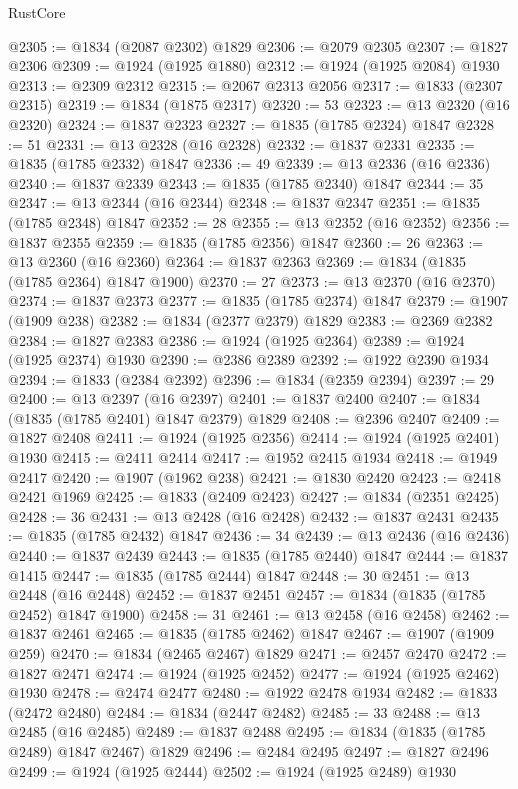 \begin{lexlean}{RustCore}
\begin{coremodule}
@2305 := @1834 (@2087 @2302) @1829
@2306 := @2079 @2305
@2307 := @1827 @2306
@2309 := @1924 (@1925 @1880)
@2312 := @1924 (@1925 @2084) @1930
@2313 := @2309 @2312
@2315 := @2067 @2313 @2056
@2317 := @1833 (@2307 @2315)
@2319 := @1834 (@1875 @2317)
@2320 := 53
@2323 := @13 @2320 (@16 @2320)
@2324 := @1837 @2323
@2327 := @1835 (@1785 @2324) @1847
@2328 := 51
@2331 := @13 @2328 (@16 @2328)
@2332 := @1837 @2331
@2335 := @1835 (@1785 @2332) @1847
@2336 := 49
@2339 := @13 @2336 (@16 @2336)
@2340 := @1837 @2339
@2343 := @1835 (@1785 @2340) @1847
@2344 := 35
@2347 := @13 @2344 (@16 @2344)
@2348 := @1837 @2347
@2351 := @1835 (@1785 @2348) @1847
@2352 := 28
@2355 := @13 @2352 (@16 @2352)
@2356 := @1837 @2355
@2359 := @1835 (@1785 @2356) @1847
@2360 := 26
@2363 := @13 @2360 (@16 @2360)
@2364 := @1837 @2363
@2369 := @1834 (@1835 (@1785 @2364) @1847 @1900)
@2370 := 27
@2373 := @13 @2370 (@16 @2370)
@2374 := @1837 @2373
@2377 := @1835 (@1785 @2374) @1847
@2379 := @1907 (@1909 @238)
@2382 := @1834 (@2377 @2379) @1829
@2383 := @2369 @2382
@2384 := @1827 @2383
@2386 := @1924 (@1925 @2364)
@2389 := @1924 (@1925 @2374) @1930
@2390 := @2386 @2389
@2392 := @1922 @2390 @1934
@2394 := @1833 (@2384 @2392)
@2396 := @1834 (@2359 @2394)
@2397 := 29
@2400 := @13 @2397 (@16 @2397)
@2401 := @1837 @2400
@2407 := @1834 (@1835 (@1785 @2401) @1847 @2379) @1829
@2408 := @2396 @2407
@2409 := @1827 @2408
@2411 := @1924 (@1925 @2356)
@2414 := @1924 (@1925 @2401) @1930
@2415 := @2411 @2414
@2417 := @1952 @2415 @1934
@2418 := @1949 @2417
@2420 := @1907 (@1962 @238)
@2421 := @1830 @2420
@2423 := @2418 @2421 @1969
@2425 := @1833 (@2409 @2423)
@2427 := @1834 (@2351 @2425)
@2428 := 36
@2431 := @13 @2428 (@16 @2428)
@2432 := @1837 @2431
@2435 := @1835 (@1785 @2432) @1847
@2436 := 34
@2439 := @13 @2436 (@16 @2436)
@2440 := @1837 @2439
@2443 := @1835 (@1785 @2440) @1847
@2444 := @1837 @1415
@2447 := @1835 (@1785 @2444) @1847
@2448 := 30
@2451 := @13 @2448 (@16 @2448)
@2452 := @1837 @2451
@2457 := @1834 (@1835 (@1785 @2452) @1847 @1900)
@2458 := 31
@2461 := @13 @2458 (@16 @2458)
@2462 := @1837 @2461
@2465 := @1835 (@1785 @2462) @1847
@2467 := @1907 (@1909 @259)
@2470 := @1834 (@2465 @2467) @1829
@2471 := @2457 @2470
@2472 := @1827 @2471
@2474 := @1924 (@1925 @2452)
@2477 := @1924 (@1925 @2462) @1930
@2478 := @2474 @2477
@2480 := @1922 @2478 @1934
@2482 := @1833 (@2472 @2480)
@2484 := @1834 (@2447 @2482)
@2485 := 33
@2488 := @13 @2485 (@16 @2485)
@2489 := @1837 @2488
@2495 := @1834 (@1835 (@1785 @2489) @1847 @2467) @1829
@2496 := @2484 @2495
@2497 := @1827 @2496
@2499 := @1924 (@1925 @2444)
@2502 := @1924 (@1925 @2489) @1930

\end{coremodule}
\end{lexlean}
